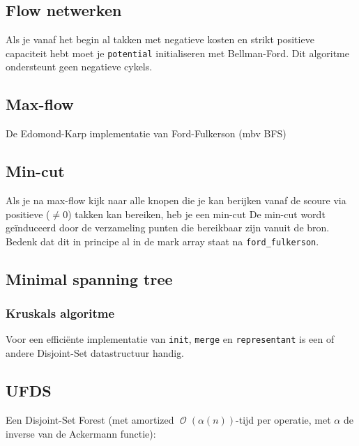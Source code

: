 \documentclass[10pt,a4paper,titlepage]{article}
\DeclareMathOperator{\bigO}{\mathcal{O}}
\begin{document}
\subsection{Flow netwerken}


 
 Als je vanaf het begin al takken met negatieve kosten en strikt positieve capaciteit hebt moet je \texttt{potential} initialiseren met Bellman-Ford. Dit algoritme ondersteunt geen negatieve cykels.
 
\subsection{Max-flow}
De Edomond-Karp implementatie van Ford-Fulkerson (mbv BFS)

\subsection{Min-cut}
Als je na max-flow kijk naar alle knopen die je kan berijken vanaf de scoure via positieve ($\not=0$) takken kan bereiken, heb je een min-cut
De min-cut wordt ge\"{i}nduceerd door de verzameling punten die bereikbaar zijn vanuit de bron. Bedenk dat dit in principe al in de mark array staat na \texttt{ford\_fulkerson}.

\iftrue
\subsection{Minimal spanning tree}

\subsubsection{Kruskals algoritme}


Voor een efficiënte implementatie van \lstinline{init}, \lstinline{merge} en \lstinline{representant} is een of andere Disjoint-Set datastructuur handig. 
\fi
\subsection{UFDS}
Een Disjoint-Set Forest (met amortized $\bigO(\alpha(n))$-tijd per operatie, met $\alpha$ de inverse van de Ackermann functie):


\iftrue
\end{document}
